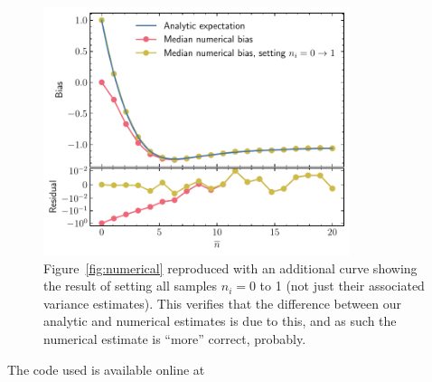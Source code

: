 \documentclass{article}
\begin{document}
\begin{figure}
	\begin{center}
		\includegraphics[width=0.8\textwidth]{figures/difference_explanation.pdf}
	\end{center}
	\caption{%
		Figure~\ref{fig:numerical} reproduced with an additional curve
		showing the result of setting all samples $n_i = 0$ to 1 (not
		just their associated variance estimates). This verifies that 
		the difference between our analytic and numerical estimates is
		due to this, and as such the numerical estimate is ``more''
		correct, probably.
	}
	\label{fig:difference}
\end{figure}

The code used is available online at
\end{document}
